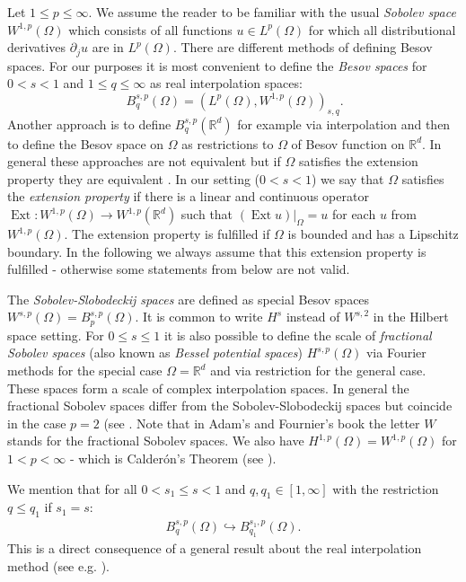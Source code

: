\documentclass{amsart}
\newcommand{\R}{\mathbb{R}}
\DeclareMathOperator{\Ext}{Ext}
\begin{document}
\begin{appendix}
Let $1\leq p\leq \infty$. We assume the reader to be familiar with the usual \emph{Sobolev space} $W^{1,p}(\Omega)$ which consists of all functions $u\in L^p(\Omega)$ for which all distributional derivatives $\partial_ju$ are in $L^p(\Omega)$. There are different methods of defining Besov spaces. For our purposes it is most convenient to define the \emph{Besov spaces} for $0<s<1$ and $1\leq q\leq \infty$ as real interpolation spaces:
\begin{equation}\
 B^{s,p}_q(\Omega) = (L^p(\Omega), W^{1,p}(\Omega))_{s, q} .
\end{equation}
Another approach is to define $B^{s,p}_q(\R^d)$ for example via interpolation and then to define the Besov space on $\Omega$ as restrictions to $\Omega$ of Besov function on $\R^d$. In general these approaches are not equivalent but if $\Omega$ satisfies the extension property they are equivalent \cite[Chapter 34]{Tartar}. In our setting ($0<s<1$) we say that $\Omega$ satisfies the \emph{extension property} if there is a linear and continuous operator $\Ext:W^{1,p}(\Omega)\rightarrow W^{1,p}(\R^d)$ such that $(\Ext u)|_{\Omega}=u$ for each $u$ from $W^{1,p}(\Omega)$. The extension property is fulfilled if $\Omega$ is bounded and has a Lipschitz boundary. In the following we always assume that this extension property is fulfilled - otherwise some statements from below are not valid.

The \emph{Sobolev-Slobodeckij spaces} are defined as special Besov spaces $W^{s,p}(\Omega)=B^{s,p}_p(\Omega)$. It is common to write $H^s$ instead of $W^{s,2}$ in the Hilbert space setting. For $0\leq s \leq 1$ it is also possible to define the scale of \emph{fractional Sobolev spaces} (also known as \emph{Bessel potential spaces}) $H^{s,p}(\Omega)$ via Fourier methods for the special case $\Omega=\R^d$ and via restriction for the general case. These spaces form a scale of complex interpolation spaces. In general the fractional Sobolev spaces differ from the Sobolev-Slobodeckij spaces but coincide in the case $p=2$ (see \cite[Chapter 7.67]{AdamsFournier}. Note that in Adam's and Fournier's book the letter $W$ stands for the fractional Sobolev spaces. We also have $H^{1,p}(\Omega)=W^{1,p}(\Omega)$ for $1<p<\infty$ - which is Calder\'on's Theorem (see \cite[page 7]{JonssonWallin}).

We mention that for all $0<s_1\leq s<1$ and $q,q_1\in [1,\infty]$ with the restriction $q\leq q_1$ if $s_1=s$:
\begin{align*}
 B^{s, p}_q(\Omega) \hookrightarrow B^{s_1, p}_{q_1}(\Omega) .
\end{align*}
This is a direct consequence of a general result about the real interpolation method (see e.g. \cite[Lemma 22.2]{Tartar}).


\end{appendix}
\end{document}
